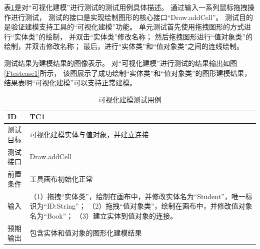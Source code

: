 表\ref{testcase1}是对“可视化建模”进行测试的测试用例具体描述。
通过输入一系列鼠标拖拽操作进行测试，
测试的接口是实现绘制图形的核心接口“Draw.addCell”。
测试目的是验证建模支持工具的“可视化建模”功能。
单元测试首先使用拖拽图形的方式进行“实体类”的绘制，
并双击“实体类”修改名称；
然后拖拽图形进行“值对象类”的绘制，并双击修改名称；
最后，进行“实体类”和“值对象类”之间的连线绘制。

测试结果为建模结果的图像表示。
对“可视化建模”进行测试的结果输出如图\ref{Ftestcase1}所示，
该图展示了成功绘制“实体类”和“值对象类”的图形建模结果，
结果表明“可视化建模”可以支持正常建模。

{\footnotesize
\begin{longtable}[h]{m{80pt}|m{305pt}}
    \caption[可视化建模测试用例]{可视化建模测试用例} \label{testcase1} \\
        \hline  
        ID&TC1\\
        \hline
        测试目标&可视化建模实体与值对象，并建立连接\\
        \hline
        测试接口&Draw.addCell\\
        \hline
        前置条件&工具画布初始化正常\\
        \hline
        输入&（1）拖拽“实体类”，绘制在画布中，并修改实体名为“Student”，唯一标识为“ID:String”；
            \newline（2）拖拽“值对象类”，绘制在画布中，并修改值对象名为“Book”；
            \newline（3）建立实体到值对象的连接。\\
        \hline
        预期输出&包含实体和值对象的图形化建模结果\\
        \hline  

    \end{longtable} 
}
